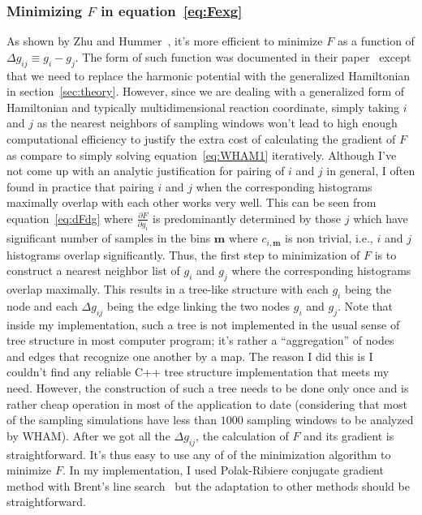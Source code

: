 \subsubsection{Minimizing $F$ in equation~\ref{eq:Fexg}}
As shown by Zhu and Hummer~\cite{Zhu2012}, it's more efficient to minimize $F$
as a function of $\Delta g_{ij} \equiv g_{i} - g_{j}$.  The form of such
function was documented in their paper~\cite{Zhu2012} except that we need to
replace the harmonic potential with the generalized Hamiltonian in
section~\ref{sec:theory}. However, since we are dealing with a generalized form
of Hamiltonian and typically multidimensional reaction coordinate, simply
taking $i$ and $j$ as the nearest neighbors of sampling windows won't lead to
high enough computational efficiency to justify the extra cost of calculating
the gradient of $F$ as compare to simply solving equation~\ref{eq:WHAM1}
iteratively. Although I've not come up with an analytic justification for
pairing of $i$ and $j$ in general, I often found in practice that pairing $i$
and $j$ when the corresponding histograms maximally overlap with each other
works very well. This can be seen from equation~\ref{eq:dFdg} where
$\frac{\partial F}{\partial g_{i}}$ is predominantly determined by those $j$
which have significant number of samples in the bins $\mathbf{m}$ where
$c_{i,\mathbf{m}}$ is non trivial, i.e., $i$ and $j$ histograms overlap significantly.
Thus, the first step to minimization of $F$ is to construct a nearest neighbor 
list of $g_{i}$ and $g_{j}$ where the corresponding histograms overlap maximally.
This results in a tree-like structure with each $g_{i}$ being the node and 
each $\Delta g_{ij}$ being the edge linking the two nodes $g_{i}$ and $g_{j}$.
Note that inside my implementation, such a tree is not implemented in the 
usual sense of tree structure in most computer program; it's rather a 
``aggregation'' of nodes and edges that recognize one another by a map. 
The reason I did this is I couldn't find any reliable C++ tree structure 
implementation that meets my need. However, the construction of such a 
tree needs to be done only once and is rather cheap operation in most of 
the application to date (considering that most of the sampling simulations
have less than $1000$ sampling windows to be analyzed by WHAM). After
we got all the $\Delta g_{ij}$, the calculation of $F$ and its gradient
is straightforward. It's thus easy to use any of of the minimization 
algorithm to minimize $F$. In my implementation, I used Polak-Ribiere 
conjugate gradient method with Brent’s line search~\cite{NumRec2007} but 
the adaptation to other methods should be straightforward. 

